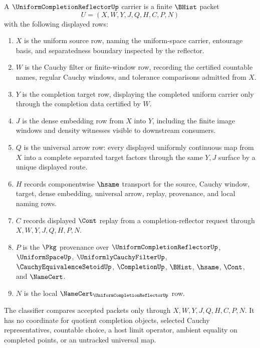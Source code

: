 \begin{definition}
\label{def:uniform-completion-reflector-carrier}
A $\UniformCompletionReflectorUp$ carrier is a finite $\BHist$ packet
$$
U=(X,W,Y,J,Q,H,C,P,N)
$$
with the following displayed rows:
\begin{enumerate}
\item $X$ is the uniform source row, naming the uniform-space carrier, entourage basis, and separatedness boundary inspected by the reflector.
\item $W$ is the Cauchy filter or finite-window row, recording the certified countable names, regular Cauchy windows, and tolerance comparisons admitted from $X$.
\item $Y$ is the completion target row, displaying the completed uniform carrier only through the completion data certified by $W$.
\item $J$ is the dense embedding row from $X$ into $Y$, including the finite image windows and density witnesses visible to downstream consumers.
\item $Q$ is the universal arrow row: every displayed uniformly continuous map from $X$ into a complete separated target factors through the same $Y,J$ surface by a unique displayed route.
\item $H$ records componentwise $\hsame$ transport for the source, Cauchy window, target, dense embedding, universal arrow, replay, provenance, and local naming rows.
\item $C$ records displayed $\Cont$ replay from a completion-reflector request through $X,W,Y,J,Q,H,P,N$.
\item $P$ is the $\Pkg$ provenance over $\UniformCompletionReflectorUp$, $\UniformSpaceUp$, $\UniformlyCauchyFilterUp$, $\CauchyEquivalenceSetoidUp$, $\CompletionUp$, $\BHist$, $\hsame$, $\Cont$, and $\NameCert$.
\item $N$ is the local $\NameCert_{\UniformCompletionReflectorUp}$ row.
\end{enumerate}
The classifier compares accepted packets only through $X,W,Y,J,Q,H,C,P,N$. It has no coordinate for quotient completion objects, selected Cauchy representatives, countable choice, a host limit operator, ambient equality on completed points, or an untracked universal map.
\end{definition}


